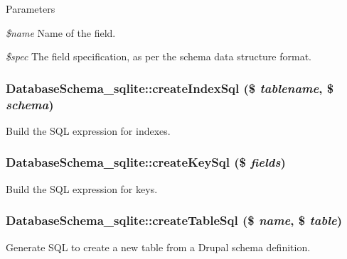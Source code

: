 \begin{DoxyParams}{Parameters}
\item[{\em \$name}]Name of the field. \item[{\em \$spec}]The field specification, as per the schema data structure format. \end{DoxyParams}
\hypertarget{classDatabaseSchema__sqlite_aee165c6e7710d1572386f3e886534843}{
\subsubsection[{createIndexSql}]{\setlength{\rightskip}{0pt plus 5cm}DatabaseSchema\_\-sqlite::createIndexSql (\$ {\em tablename}, \/  \$ {\em schema})}}
\label{classDatabaseSchema__sqlite_aee165c6e7710d1572386f3e886534843}
Build the SQL expression for indexes. \hypertarget{classDatabaseSchema__sqlite_a49b7b9de049e43a4e5df195e78b2385f}{
\subsubsection[{createKeySql}]{\setlength{\rightskip}{0pt plus 5cm}DatabaseSchema\_\-sqlite::createKeySql (\$ {\em fields})}}
\label{classDatabaseSchema__sqlite_a49b7b9de049e43a4e5df195e78b2385f}
Build the SQL expression for keys. \hypertarget{classDatabaseSchema__sqlite_a785f6c8f33c27551e0e590613bcd49c7}{
\subsubsection[{createTableSql}]{\setlength{\rightskip}{0pt plus 5cm}DatabaseSchema\_\-sqlite::createTableSql (\$ {\em name}, \/  \$ {\em table})}}
\label{classDatabaseSchema__sqlite_a785f6c8f33c27551e0e590613bcd49c7}
Generate SQL to create a new table from a Drupal schema definition.


